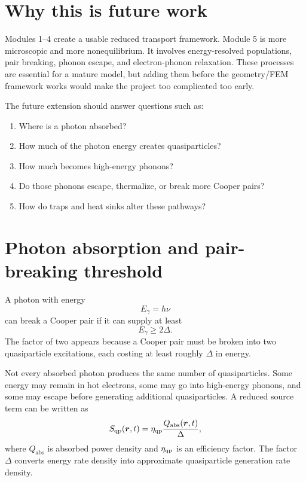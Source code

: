 \documentclass[11pt]{article}
\begin{document}
\section{Why this is future work}
Modules 1--4 create a usable reduced transport framework. Module 5 is more microscopic and more nonequilibrium. It involves energy-resolved populations, pair breaking, phonon escape, and electron-phonon relaxation. These processes are essential for a mature model, but adding them before the geometry/FEM framework works would make the project too complicated too early.

The future extension should answer questions such as:
\begin{enumerate}[leftmargin=1.6em]
    \item Where is a photon absorbed?
    \item How much of the photon energy creates quasiparticles?
    \item How much becomes high-energy phonons?
    \item Do those phonons escape, thermalize, or break more Cooper pairs?
    \item How do traps and heat sinks alter these pathways?
\end{enumerate}

\section{Photon absorption and pair-breaking threshold}
A photon with energy
\begin{equation}
E_\gamma=h\nu
\end{equation}
can break a Cooper pair if it can supply at least
\begin{equation}
E_\gamma\ge 2\Delta.
\end{equation}
The factor of two appears because a Cooper pair must be broken into two quasiparticle excitations, each costing at least roughly $\Delta$ in energy.

Not every absorbed photon produces the same number of quasiparticles. Some energy may remain in hot electrons, some may go into high-energy phonons, and some may escape before generating additional quasiparticles. A reduced source term can be written as
\begin{equation}
S_{\mathrm{qp}}(\bm{r},t)=\eta_{\mathrm{qp}}\frac{Q_{\mathrm{abs}}(\bm{r},t)}{\Delta},
\end{equation}
where $Q_{\mathrm{abs}}$ is absorbed power density and $\eta_{\mathrm{qp}}$ is an efficiency factor. The factor $\Delta$ converts energy rate density into approximate quasiparticle generation rate density.
\end{document}

